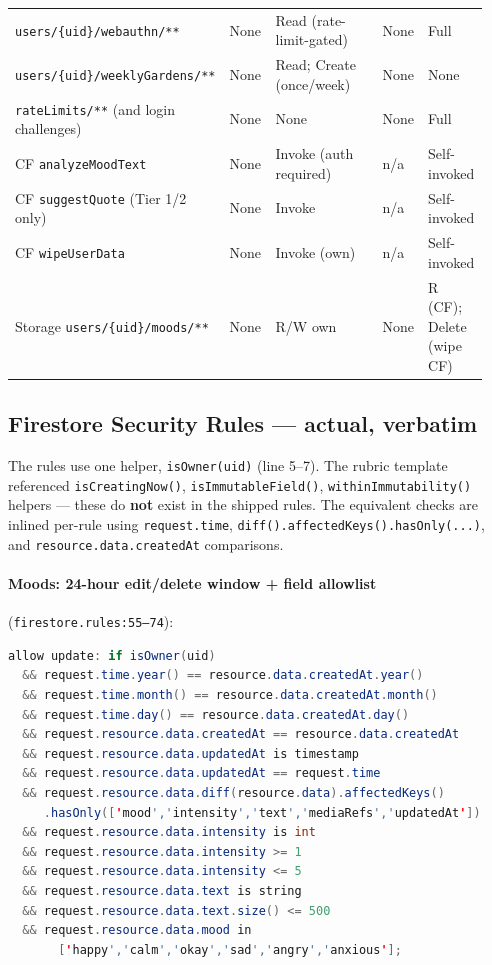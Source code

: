 \documentclass[11pt,a4paper]{article}
\begin{document}
{\begin{longtable}{@{} >{\raggedright\arraybackslash}p{0.31\linewidth} p{0.10\linewidth} >{\raggedright\arraybackslash}p{0.31\linewidth} p{0.09\linewidth} >{\raggedright\arraybackslash}p{0.13\linewidth} @{}}
\texttt{users/\allowbreak{}\{uid\}/\allowbreak{}webauthn/**}              & None & Read (rate-limit-gated) & None & Full \\
\texttt{users/\allowbreak{}\{uid\}/\allowbreak{}weeklyGardens/**}         & None & Read; Create (once/week) & None & None \\
\texttt{rateLimits/**} (and login challenges)  & None & None & None & Full \\
CF \texttt{analyzeMoodText}                    & None & Invoke (auth required) & n/a & Self-invoked \\
CF \texttt{suggestQuote} (Tier 1/2 only)       & None & Invoke & n/a & Self-invoked \\
CF \texttt{wipeUserData}                       & None & Invoke (own) & n/a & Self-invoked \\
Storage \texttt{users/\allowbreak{}\{uid\}/\allowbreak{}moods/**}          & None & R/W own & None & R (CF); Delete (wipe CF) \\
\bottomrule
\end{longtable}
}

\subsection{Firestore Security Rules --- actual, verbatim}

The rules use one helper, \texttt{isOwner(uid)} (line 5--7). The rubric
template referenced \texttt{isCreatingNow()}, \texttt{isImmutableField()},
\texttt{withinImmutability()} helpers --- these do \textbf{not} exist in
the shipped rules. The equivalent checks are inlined per-rule using
\texttt{request.time}, \texttt{diff().affectedKeys().hasOnly(...)}, and
\texttt{resource.data.createdAt} comparisons.

\paragraph{Moods: 24-hour edit/delete window + field allowlist}
(\texttt{firestore.rules:55--74}):

\begin{lstlisting}[language=Java]
allow update: if isOwner(uid)
  && request.time.year() == resource.data.createdAt.year()
  && request.time.month() == resource.data.createdAt.month()
  && request.time.day() == resource.data.createdAt.day()
  && request.resource.data.createdAt == resource.data.createdAt
  && request.resource.data.updatedAt is timestamp
  && request.resource.data.updatedAt == request.time
  && request.resource.data.diff(resource.data).affectedKeys()
     .hasOnly(['mood','intensity','text','mediaRefs','updatedAt'])
  && request.resource.data.intensity is int
  && request.resource.data.intensity >= 1
  && request.resource.data.intensity <= 5
  && request.resource.data.text is string
  && request.resource.data.text.size() <= 500
  && request.resource.data.mood in
       ['happy','calm','okay','sad','angry','anxious'];
\end{lstlisting}
\end{document}
